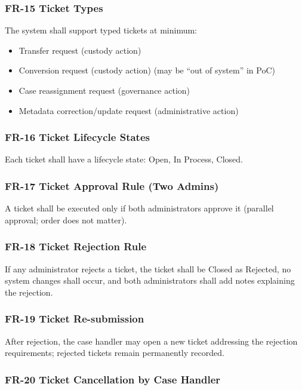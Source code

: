 \documentclass[12pt,a4paper]{report}
\begin{document}
\subsubsection{FR-15 Ticket Types}

The system shall support typed tickets at minimum:
\begin{itemize}
\item Transfer request (custody action)
\item Conversion request (custody action) (may be “out of system” in PoC)
\item Case reassignment request (governance action)
\item Metadata correction/update request (administrative action)
\end{itemize}

\subsubsection{FR-16 Ticket Lifecycle States}

Each ticket shall have a lifecycle state: Open, In Process, Closed.

\subsubsection{FR-17 Ticket Approval Rule (Two Admins)}

A ticket shall be executed only if both administrators approve it (parallel approval; order does not matter).

\subsubsection{FR-18 Ticket Rejection Rule}

If any administrator rejects a ticket, the ticket shall be Closed as Rejected, no system changes shall occur, and both administrators shall add notes explaining the rejection.

\subsubsection{FR-19 Ticket Re-submission}

After rejection, the case handler may open a new ticket addressing the rejection requirements; rejected tickets remain permanently recorded.

\subsubsection{FR-20 Ticket Cancellation by Case Handler}
\end{document}
